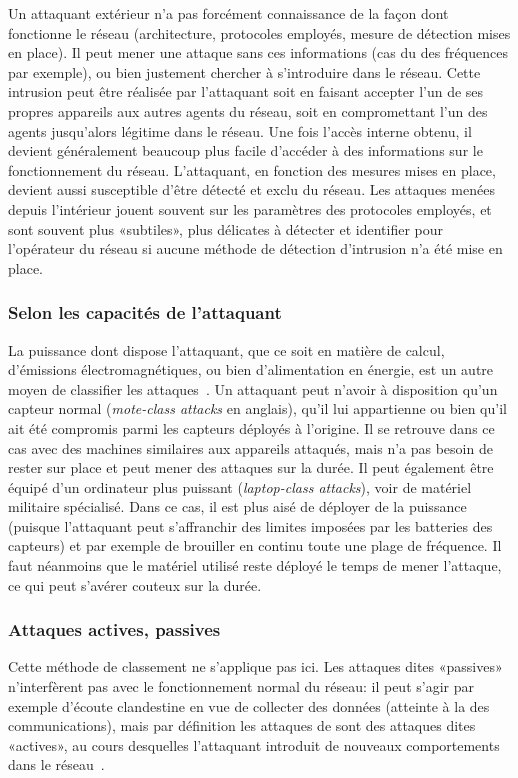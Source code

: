Un attaquant extérieur n'a pas forcément connaissance de la façon dont fonctionne le réseau (architecture, protocoles employés, mesure de détection mises en place).
Il peut mener une attaque sans ces informations (cas du  des fréquences par exemple), ou bien justement chercher à s'introduire dans le réseau.
Cette intrusion peut être réalisée par l'attaquant soit en faisant accepter l'un de ses propres appareils aux autres agents du réseau, soit en compromettant l'un des agents jusqu'alors légitime dans le réseau.
Une fois l'accès interne obtenu, il devient généralement beaucoup plus facile d'accéder à des informations sur le fonctionnement du réseau.
L'attaquant, en fonction des mesures mises en place, devient aussi susceptible d'être détecté et exclu du réseau.
Les attaques menées depuis l'intérieur jouent souvent sur les paramètres des protocoles employés, et sont souvent plus «subtiles», plus délicates à détecter et identifier pour l'opérateur du réseau si aucune méthode de détection d'intrusion n'a été mise en place.

    \subsubsection{Selon les capacités de l'attaquant}
La puissance dont dispose l'attaquant, que ce soit en matière de calcul, d'émissions électromagnétiques, ou bien d'alimentation en énergie, est un autre moyen de classifier les attaques~\cite{AD14}.
Un attaquant peut n'avoir à disposition qu'un capteur normal (\textit{mote-class attacks} en anglais), qu'il lui appartienne ou bien qu'il ait été compromis parmi les capteurs déployés à l'origine.
Il se retrouve dans ce cas avec des machines similaires aux appareils attaqués, mais n'a pas besoin de rester sur place et peut mener des attaques sur la durée.
Il peut également être équipé d'un ordinateur plus puissant (\textit{laptop-class attacks}), voir de matériel militaire spécialisé.
Dans ce cas, il est plus aisé de déployer de la puissance (puisque l'attaquant peut s'affranchir des limites imposées par les batteries des capteurs) et par exemple de brouiller en continu toute une plage de fréquence.
Il faut néanmoins que le matériel utilisé reste déployé le temps de mener l'attaque, ce qui peut s'avérer couteux sur la durée.

    \subsubsection{Attaques actives, passives}
Cette méthode de classement ne s'applique pas ici.
Les attaques dites «passives» n'interfèrent pas avec le fonctionnement normal du réseau: il peut s'agir par exemple d'écoute clandestine en vue de collecter des données (atteinte à la  des communications), mais par définition les attaques de \dds sont des attaques dites «actives», au cours desquelles l'attaquant introduit de nouveaux comportements dans le réseau~\cite{SZFDXC14}.

